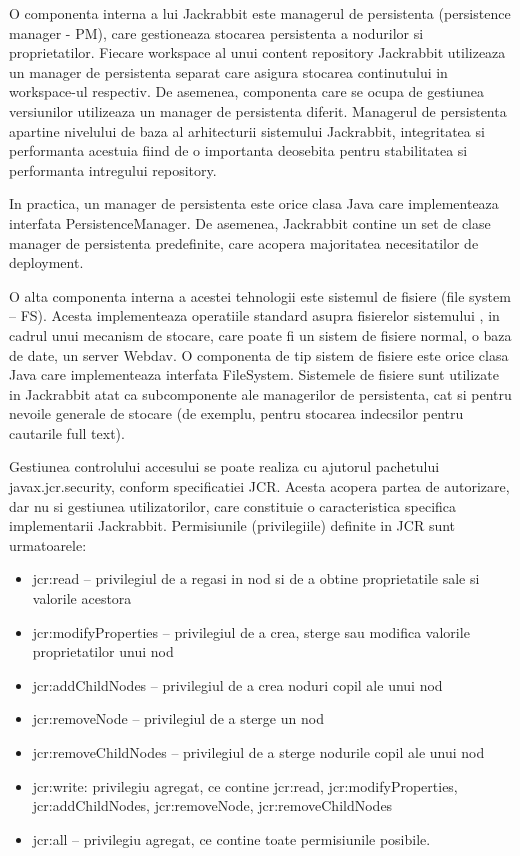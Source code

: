 \bigskip

O componenta interna a lui Jackrabbit este managerul de persistenta (persistence manager - PM), care gestioneaza stocarea persistenta a nodurilor si proprietatilor. Fiecare workspace al unui content repository Jackrabbit utilizeaza un manager de persistenta separat care asigura stocarea continutului in workspace-ul respectiv. De asemenea, componenta care se ocupa de gestiunea versiunilor utilizeaza un manager de persistenta diferit. Managerul de persistenta apartine nivelului de baza al arhitecturii sistemului Jackrabbit, integritatea si performanta acestuia fiind de o importanta deosebita pentru stabilitatea si performanta intregului repository. 

In practica, un manager de persistenta este orice clasa Java care implementeaza interfata PersistenceManager. De asemenea, Jackrabbit contine un set de clase manager de persistenta predefinite, care acopera majoritatea necesitatilor de deployment. \ 


\bigskip

O alta componenta interna a acestei tehnologii este sistemul de fisiere (file system -- FS). Acesta implementeaza operatiile standard asupra fisierelor sistemului , in cadrul unui mecanism de stocare, care poate fi un sistem de fisiere normal, o baza de date, un server Webdav. O componenta de tip sistem de fisiere este orice clasa Java care implementeaza interfata FileSystem. Sistemele de fisiere sunt utilizate in Jackrabbit atat ca subcomponente ale managerilor de persistenta, cat si pentru nevoile generale de stocare (de exemplu, pentru stocarea indecsilor pentru cautarile full text). \ 


\bigskip

Gestiunea controlului accesului se poate realiza cu ajutorul pachetului javax.jcr.security, conform specificatiei JCR. Acesta acopera partea de autorizare, dar nu si gestiunea utilizatorilor, care constituie o caracteristica specifica implementarii Jackrabbit. Permisiunile (privilegiile) definite in JCR sunt urmatoarele:

\begin{itemize}
\item jcr:read -- privilegiul de a regasi in nod si de a obtine proprietatile sale si valorile acestora
\item jcr:modifyProperties -- privilegiul de a crea, sterge sau modifica valorile proprietatilor unui nod
\item jcr:addChildNodes -- privilegiul de a crea noduri copil ale unui nod
\item jcr:removeNode -- privilegiul de a sterge un nod
\item jcr:removeChildNodes -- privilegiul de a sterge nodurile copil ale unui nod
\item jcr:write: privilegiu agregat, ce contine jcr:read, jcr:modifyProperties, jcr:addChildNodes, jcr:removeNode, jcr:removeChildNodes
\item jcr:all -- privilegiu agregat, ce contine toate permisiunile posibile.
\end{itemize}

